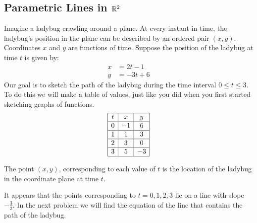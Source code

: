 \documentclass{ximera}
\begin{document}
\subsection*{Parametric Lines in $\mathbb{R}^2$}
\begin{exploration}\label{init:paramline2d}
Imagine a ladybug crawling around a plane.  At every instant in time, the ladybug's position in the plane can be described by an ordered pair $(x, y)$.  Coordinates $x$ and $y$ are functions of time.  Suppose the position of the ladybug at time $t$ is given by:
\begin{align*}
x&=2t-1\\
y&=-3t+6
\end{align*}
Our goal is to sketch the path of the ladybug during the time interval $0\leq t\leq 3$.  To do this we will make a table of values, just like you did when you first started sketching graphs of functions.
$$\begin{array}{|c|c|c|}  
 \hline t& x & y\\ 
 \hline 0 & -1 & 6\\ 
 \hline 1 & 1 & 3 \\
 \hline 2 & 3& 0\\
 \hline 3 & 5& -3\\
 \hline
 \end{array}$$
 
The point $(x, y)$, corresponding to each value of $t$ is the location of the ladybug in the coordinate plane at time $t$. 
 \begin{center}
\end{center}

It appears that the points corresponding to $t=0, 1, 2, 3$ lie on a line with slope $-\frac{3}{2}$.  In the next problem we will find the equation of the line that contains the path of the ladybug.
\end{exploration}
\end{document}
